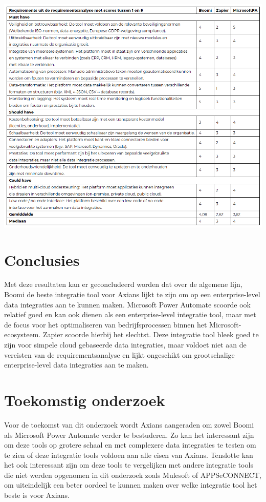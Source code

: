 \documentclass[a0,portrait]{hogent-poster}
\begin{document}
\begin{multicols}{2}
\begin{center}
  \captionsetup{type=figure}
  \includegraphics[width=1.0\linewidth]{../poster/images/Eindresultaat.png}
\end{center}

\section{Conclusies}

Met deze resultaten kan er geconcludeerd worden dat over de algemene lijn, Boomi de beste integratie tool voor Axians lijkt te zijn om op een enterprise-level data integraties aan te kunnen maken. Microsoft Power Automate scoorde ook relatief goed en kan ook dienen als een enterprise-level integratie tool, maar met de focus voor het optimaliseren van bedrijfsprocessen binnen het Microsoft-ecosysteem. Zapier scoorde hierbij het slechtst. Deze integratie tool bleek goed te zijn voor simpele cloud gebaseerde data integraties, maar voldoet niet aan de vereisten van de requirementsanalyse en lijkt ongeschikt om grootschalige enterprise-level data integraties aan te maken.

\section{Toekomstig onderzoek}

Voor de toekomst van dit onderzoek wordt Axians aangeraden om zowel Boomi als Microsoft Power Automate verder te bestuderen. Zo kan het interessant zijn om deze tools op grotere schaal en met complexere data integraties te testen om te zien of deze integratie tools voldoen aan alle eisen van Axians. Tenslotte kan het ook interessant zijn om deze tools te vergelijken met andere integratie tools die niet werden opgenomen in dit onderzoek zoals Mulesoft of APPSeCONNECT, om uiteindelijk een beter oordeel te kunnen maken over welke integratie tool het beste is voor Axians.

\end{multicols}
\end{document}
